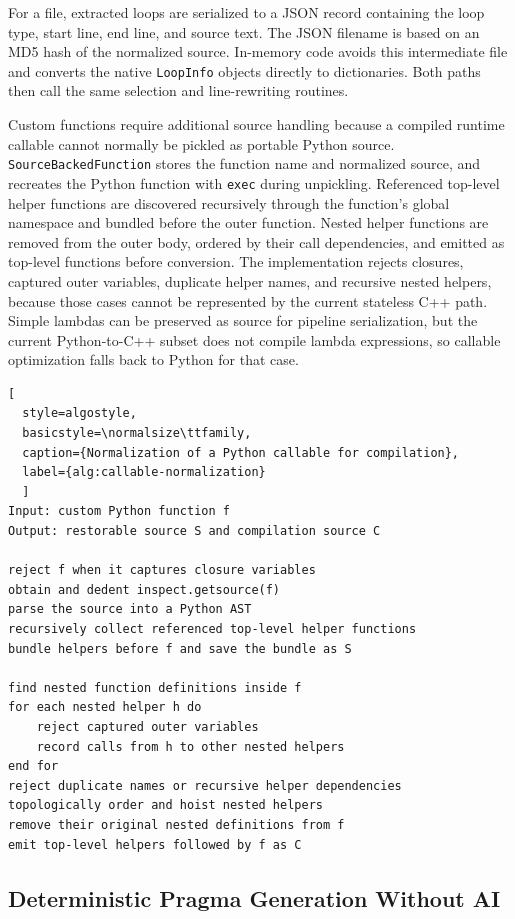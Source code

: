 For a file, extracted loops are serialized to a JSON record containing the loop
type, start line, end line, and source text. The JSON filename is based on an MD5
hash of the normalized source. In-memory code avoids this intermediate file and
converts the native \texttt{LoopInfo} objects directly to dictionaries. Both
paths then call the same selection and line-rewriting routines.

Custom functions require additional source handling because a compiled runtime
callable cannot normally be pickled as portable Python source.
\texttt{SourceBackedFunction} stores the function name and normalized source,
and recreates the Python function with \texttt{exec} during unpickling. Referenced
top-level helper functions are discovered recursively through the function's
global namespace and bundled before the outer function. Nested helper functions
are removed from the outer body, ordered by their call dependencies, and emitted
as top-level functions before conversion. The implementation rejects closures,
captured outer variables, duplicate helper names, and recursive nested helpers,
because those cases cannot be represented by the current stateless C++ path.
Simple lambdas can be preserved as source for pipeline serialization, but the
current Python-to-C++ subset does not compile lambda expressions, so callable
optimization falls back to Python for that case.

\begin{lstlisting}[
  style=algostyle,
  basicstyle=\normalsize\ttfamily,
  caption={Normalization of a Python callable for compilation},
  label={alg:callable-normalization}
  ]
Input: custom Python function f
Output: restorable source S and compilation source C

reject f when it captures closure variables
obtain and dedent inspect.getsource(f)
parse the source into a Python AST
recursively collect referenced top-level helper functions
bundle helpers before f and save the bundle as S

find nested function definitions inside f
for each nested helper h do
    reject captured outer variables
    record calls from h to other nested helpers
end for
reject duplicate names or recursive helper dependencies
topologically order and hoist nested helpers
remove their original nested definitions from f
emit top-level helpers followed by f as C
\end{lstlisting}

\subsection{Deterministic Pragma Generation Without AI}

